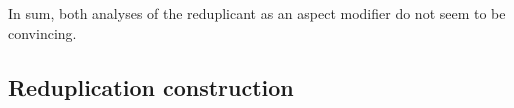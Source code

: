 In sum, both analyses of the reduplicant as an aspect modifier do not seem to be convincing.




 
 
\subsection{Reduplication construction}\label{sec:construc}
 
 


